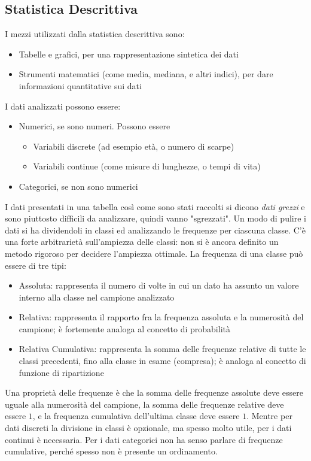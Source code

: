 \documentclass{article}
\theoremstyle{plain}
\theoremstyle{definition}
\theoremstyle{remark}
\begin{document}
\subsection{Statistica Descrittiva} %
\label{sub:statistica_descrittiva}
I mezzi utilizzati dalla statistica descrittiva sono:
\begin{itemize}
	\item Tabelle e grafici, per una rappresentazione sintetica dei dati
	\item Strumenti matematici (come media, mediana, e altri indici), per dare informazioni quantitative sui dati
\end{itemize}
I dati analizzati possono essere:
\begin{itemize}
	\item Numerici, se sono numeri. Possono essere
	\begin{itemize}
		\item Variabili discrete (ad esempio età, o numero di scarpe)
		\item Variabili continue (come misure di lunghezze, o tempi di vita)
	\end{itemize}
	\item Categorici, se non sono numerici
\end{itemize}
I dati presentati in una tabella così come sono stati raccolti si dicono \textit{dati grezzi} e sono piuttosto difficili da analizzare, quindi vanno "sgrezzati". Un modo di pulire i dati si ha dividendoli in classi ed analizzando le frequenze per ciascuna classe. C'è una forte arbitrarietà sull'ampiezza delle classi: non si è ancora definito un metodo rigoroso per decidere l'ampiezza ottimale. La frequenza di una classe può essere di tre tipi:
\begin{itemize}
	\item Assoluta: rappresenta il numero di volte in cui un dato ha assunto un valore interno alla classe nel campione analizzato
	\item Relativa: rappresenta il rapporto fra la frequenza assoluta e la numerosità del campione; è fortemente analoga al concetto di probabilità
	\item Relativa Cumulativa: rappresenta la somma delle frequenze relative di tutte le classi precedenti, fino alla classe in esame (compresa); è analoga al concetto di funzione di ripartizione
\end{itemize}
Una proprietà delle frequenze è che la somma delle frequenze assolute deve essere uguale alla numerosità del campione, la somma delle frequenze relative deve essere $1$, e la frequenza cumulativa dell'ultima classe deve essere $1$. Mentre per dati discreti la divisione in classi è opzionale, ma spesso molto utile, per i dati continui è necessaria. Per i dati categorici non ha senso parlare di frequenze cumulative, perché spesso non è presente un ordinamento.
\end{document}
